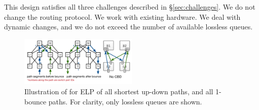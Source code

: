 
This design satisfies all three challenges described in \S\ref{sec:challenges}.
We do not change the routing protocol. We work with existing hardware. We deal
with dynamic changes, and we do not exceed the number of available
lossless queues.

\begin{figure}[t]
	\centering
	\includegraphics[width=0.5\textwidth] {figs/cbd_b}
	\caption{Illustration of \sysname{} for ELP of all shortest up-down paths,
		and all 1-bounce paths. For clarity, only lossless queues are shown.}
	\label{fig:clos_tagger}
\end{figure}

